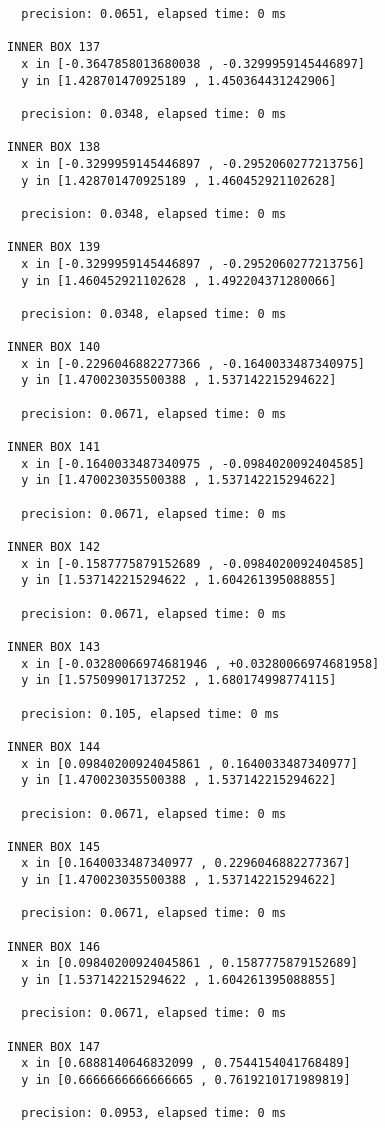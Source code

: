 \begin{verbatim}
  precision: 0.0651, elapsed time: 0 ms

INNER BOX 137
  x in [-0.3647858013680038 , -0.3299959145446897]
  y in [1.428701470925189 , 1.450364431242906]

  precision: 0.0348, elapsed time: 0 ms

INNER BOX 138
  x in [-0.3299959145446897 , -0.2952060277213756]
  y in [1.428701470925189 , 1.460452921102628]

  precision: 0.0348, elapsed time: 0 ms

INNER BOX 139
  x in [-0.3299959145446897 , -0.2952060277213756]
  y in [1.460452921102628 , 1.492204371280066]

  precision: 0.0348, elapsed time: 0 ms

INNER BOX 140
  x in [-0.2296046882277366 , -0.1640033487340975]
  y in [1.470023035500388 , 1.537142215294622]

  precision: 0.0671, elapsed time: 0 ms

INNER BOX 141
  x in [-0.1640033487340975 , -0.0984020092404585]
  y in [1.470023035500388 , 1.537142215294622]

  precision: 0.0671, elapsed time: 0 ms

INNER BOX 142
  x in [-0.1587775879152689 , -0.0984020092404585]
  y in [1.537142215294622 , 1.604261395088855]

  precision: 0.0671, elapsed time: 0 ms

INNER BOX 143
  x in [-0.03280066974681946 , +0.03280066974681958]
  y in [1.575099017137252 , 1.680174998774115]

  precision: 0.105, elapsed time: 0 ms

INNER BOX 144
  x in [0.09840200924045861 , 0.1640033487340977]
  y in [1.470023035500388 , 1.537142215294622]

  precision: 0.0671, elapsed time: 0 ms

INNER BOX 145
  x in [0.1640033487340977 , 0.2296046882277367]
  y in [1.470023035500388 , 1.537142215294622]

  precision: 0.0671, elapsed time: 0 ms

INNER BOX 146
  x in [0.09840200924045861 , 0.1587775879152689]
  y in [1.537142215294622 , 1.604261395088855]

  precision: 0.0671, elapsed time: 0 ms

INNER BOX 147
  x in [0.6888140646832099 , 0.7544154041768489]
  y in [0.6666666666666665 , 0.7619210171989819]

  precision: 0.0953, elapsed time: 0 ms


\end{verbatim}
